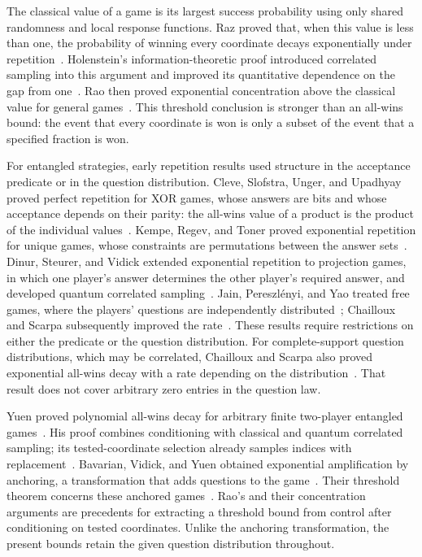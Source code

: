 The classical value of a game is its largest success probability using
only shared randomness and local response functions. Raz proved that,
when this value is less than one, the probability of winning every
coordinate decays exponentially under repetition~\cite{raz1998}.
Holenstein's information-theoretic proof introduced correlated sampling
into this argument and improved its quantitative dependence on the gap
from one~\cite{holenstein2009}. Rao then proved exponential concentration
above the classical value for general games~\cite[Theorem~7]{rao2011}.
This threshold conclusion is stronger than an all-wins bound: the event
that every coordinate is won is only a subset of the event that a
specified fraction is won.

For entangled strategies, early repetition results used structure in
the acceptance predicate or in the question distribution. Cleve,
Slofstra, Unger, and Upadhyay proved perfect repetition for XOR games,
whose answers are bits and whose acceptance depends on their parity:
the all-wins value of a product is the product of the individual
values~\cite{csuu2008}. Kempe, Regev, and Toner proved exponential
repetition for unique games, whose constraints are permutations between
the answer sets~\cite{krt2010}. Dinur, Steurer, and Vidick extended
exponential repetition to projection games, in which one player's
answer determines the other player's required answer, and developed
quantum correlated sampling~\cite{dsv2015}. Jain, Pereszl\'enyi, and Yao
treated free games, where the players' questions are independently
distributed~\cite{jpy2014}; Chailloux and Scarpa subsequently improved
the rate~\cite{cs2015}. These results require restrictions on either
the predicate or the question distribution.
For complete-support question distributions, which may be correlated,
Chailloux and Scarpa also proved exponential all-wins decay with a rate
depending on the distribution~\cite[Corollary~1, corrected version]{cs2014}.
That result does not cover arbitrary zero entries in the question law.

Yuen proved polynomial all-wins decay for arbitrary finite two-player
entangled games~\cite[Theorem~1]{yuen2016}. His proof combines
conditioning with classical and quantum correlated sampling; its
tested-coordinate selection already samples indices with
replacement~\cite[Proposition~9, full version]{yuen2016}.
Bavarian, Vidick, and Yuen obtained exponential amplification by
anchoring, a transformation that adds questions to the
game~\cite{bvy2022}. Their threshold theorem concerns these anchored
games~\cite[Section~5.4, Theorem~5.6]{bvy2017}. Rao's and their
concentration arguments are precedents for extracting a threshold bound
from control after conditioning on tested coordinates. Unlike the
anchoring transformation, the present bounds retain the given question
distribution throughout.

